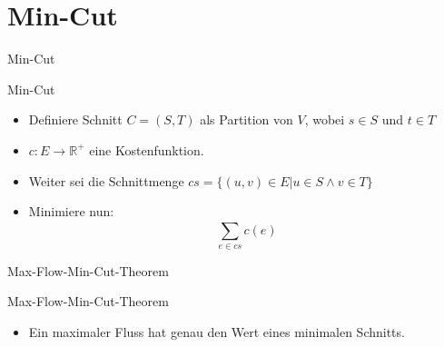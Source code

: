 \documentclass[18pt]{beamer}
\begin{document}
\section{Min-Cut}
\begin{frame}{Min-Cut}
\begin{block}{Min-Cut}

\begin{itemize}
\item Definiere Schnitt \(C = (S, T)\) als Partition von \(V\), wobei \(s \in S\) und \(t \in T\) 
\item $c: E \to \mathbb{R}^+$ eine Kostenfunktion.
\item Weiter sei die Schnittmenge \(cs = \{(u, v) \in E | u \in S \land v \in T\}\)
\item Minimiere nun: 
\begin{equation*}
	\displaystyle \sum_{e\in cs}^{} c(e)
\end{equation*} 
\end{itemize}
\end{block}
\end{frame}

\begin{frame}{Max-Flow-Min-Cut-Theorem}
\begin{block}{Max-Flow-Min-Cut-Theorem}
\begin{itemize}
\item Ein maximaler Fluss hat genau den Wert eines minimalen Schnitts.
\end{itemize}
\end{block}
\end{frame}
\end{document}
